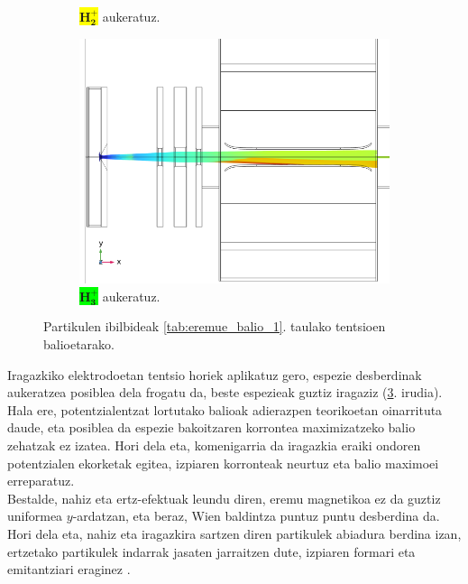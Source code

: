 \documentclass[12pt]{article}
\numberwithin{figure}{section}
\numberwithin{equation}{section}
\begin{document}
\begin{figure}[h]
\begin{subfigure}[b]{0.3\textwidth}
        \caption{\colorbox{yellow}{$\mathbf{H_2^+}$} aukeratuz.}
        \label{fig:sistema_finala_xy}
    \end{subfigure}
    \hspace{0.01\textwidth}
    \begin{subfigure}[b]{0.3\textwidth}
        \centering
        \includegraphics[width=\linewidth]{4 - Diseinua/h3+_sistema_osoa.png}
        \caption{\colorbox{lime}{$\mathbf{H_3^+}$} aukeratuz.}
        \label{fig:sistema_finala_xy}
    \end{subfigure}
    \caption{Partikulen ibilbideak \ref{tab:eremue_balio_1}. taulako tentsioen balioetarako.}
    \label{fig:iragazketa}
\end{figure}

Iragazkiko elektrodoetan tentsio horiek aplikatuz gero, espezie desberdinak aukeratzea posiblea dela frogatu da, beste espezieak guztiz iragaziz (\ref{fig:iragazketa}. irudia). Hala ere, potentzialentzat lortutako balioak adierazpen teorikoetan oinarrituta daude, eta posiblea da espezie bakoitzaren korrontea maximizatzeko balio zehatzak ez izatea. Hori dela eta, komenigarria da iragazkia eraiki ondoren potentzialen ekorketak egitea, izpiaren korronteak neurtuz eta balio maximoei erreparatuz.\\

Bestalde, nahiz eta ertz-efektuak leundu diren, eremu magnetikoa ez da guztiz uniformea $y$-ardatzan, eta beraz, Wien baldintza puntuz puntu desberdina da. Hori dela eta, nahiz eta iragazkira sartzen diren partikulek abiadura berdina izan, ertzetako partikulek indarrak jasaten jarraitzen dute, izpiaren formari eta emitantziari eraginez \cite{Yasuda:2019rzc}.
\end{document}
